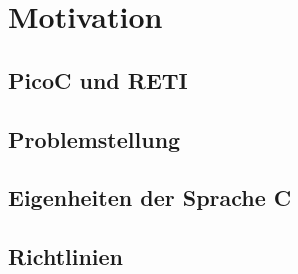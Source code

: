 \chapter{Motivation}
\label{ch:motivation}

\section{PicoC und RETI}
\section{Problemstellung}
\section{Eigenheiten der Sprache C}
\section{Richtlinien}
